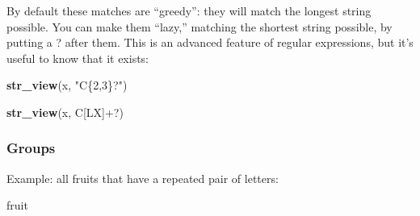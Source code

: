 \documentclass[
]{article}
\newenvironment{Shaded}{\begin{snugshade}}{\end{snugshade}}
\newcommand{\KeywordTok}[1]{\textcolor[rgb]{0.13,0.29,0.53}{\textbf{#1}}}
\newcommand{\NormalTok}[1]{#1}
\newcommand{\StringTok}[1]{\textcolor[rgb]{0.31,0.60,0.02}{#1}}
\begin{document}
By default these matches are ``greedy'': they will match the longest
string possible. You can make them ``lazy,'' matching the shortest
string possible, by putting a ? after them. This is an advanced feature
of regular expressions, but it's useful to know that it exists:

\begin{Shaded}
\begin{Highlighting}[]
\KeywordTok{str\_view}\NormalTok{(x, }\StringTok{"C\{2,3\}?"}\NormalTok{)}
\end{Highlighting}
\end{Shaded}

\hypertarget{htmlwidget-89598cf01d9763e7a0a0}{}
\begin{str_view}

\end{str_view}

\begin{Shaded}
\begin{Highlighting}[]
\KeywordTok{str\_view}\NormalTok{(x, }\StringTok{\textquotesingle{}C[LX]+?\textquotesingle{}}\NormalTok{)}
\end{Highlighting}
\end{Shaded}

\hypertarget{htmlwidget-22be6fe51be48674774a}{}
\begin{str_view}

\end{str_view}

\hypertarget{groups}{%
\subsubsection{Groups}\label{groups}}

Example: all fruits that have a repeated pair of letters:

\begin{Shaded}
\begin{Highlighting}[]
\NormalTok{fruit}
\end{Highlighting}
\end{Shaded}
\end{document}
